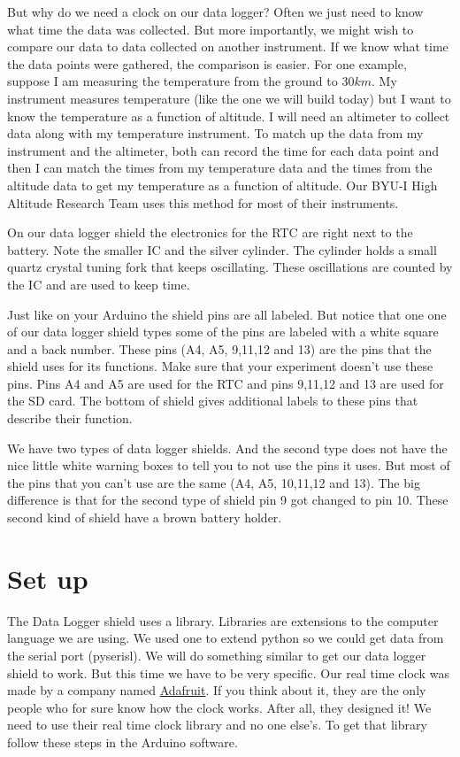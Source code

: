 	But why do we need a clock on our data logger?  Often we just need to know what time the data was collected.  But more importantly, we might wish to compare our data to data collected on another instrument. If we know what time the data points were gathered, the comparison is easier.  For one example, suppose I am measuring the temperature from the ground to $30km$. My instrument measures temperature (like the one we will build today) but I want to know the temperature as a function of altitude.  I will need an altimeter to collect data along with my temperature instrument.  To match up the data from my instrument and the altimeter, both can record the time for each data point and then I can match the times from my temperature data and the times from the altitude data to get my temperature as a function of altitude.  Our BYU-I High Altitude Research Team uses this method for most of their instruments.
	
	On our data logger shield the electronics for the RTC are right next to the battery. Note the smaller IC and the silver cylinder. The cylinder holds a small quartz crystal tuning fork that keeps oscillating. These oscillations are counted by the IC and are used to keep time. 
	
	
	Just like on your Arduino the shield pins are all labeled. But notice that one one of our data logger shield types some of the pins are labeled with a white square and a back number. These pins (A4, A5, 9,11,12 and 13) are the pins that the shield uses for its functions. Make sure that your experiment doesn't use these pins. Pins A4 and A5 are used for the RTC and pins 9,11,12 and 13 are used for the SD card. The bottom of shield gives additional labels to these pins that describe their function.
	 
 	We have two types of data logger shields. And the second type does not have the nice little white warning boxes to tell you to not use the pins it uses.  But most of the pins that you can't use are the same (A4, A5, 10,11,12 and 13). The big difference is that for the second type of shield pin 9 got changed to pin 10.  These second kind of shield have a brown battery holder.  
 
 

\section{Set up}
	The Data Logger shield uses a library. Libraries are extensions to the computer language we are using. We used one to extend python so we could get data from the serial port (pyserisl).  We will do something similar to get our data logger shield to work. But this time we have to be very specific. Our real time clock was made by a company named \href{http://www.adafruit.com}{ Adafruit}. If you think about it, they are the only people who for sure know how the clock works.  After all, they designed it! We need to use their real time clock library and no one else's.  To get that library follow these steps in the Arduino software.
	
